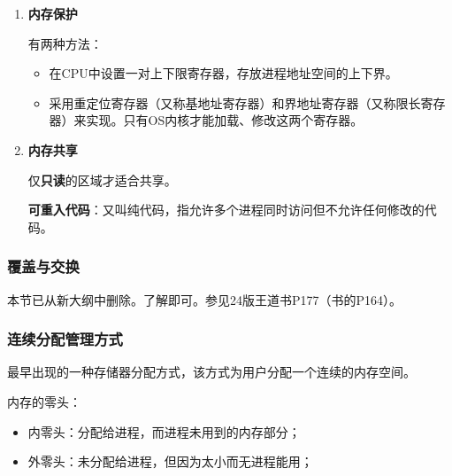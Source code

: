 \documentclass[12pt, a4paper, oneside]{ctexart}
\begin{document}
\begin{enumerate}
  \item {\bf 内存保护}
  
  有两种方法：
  \begin{itemize}
    \item 在CPU中设置一对上下限寄存器，存放进程地址空间的上下界。
    \item 采用重定位寄存器（又称基地址寄存器）和界地址寄存器（又称限长寄存器）来实现。只有OS内核才能加载、修改这两个寄存器。
  \end{itemize}

  \item {\bf 内存共享}
  
  仅\textbf{只读}的区域才适合共享。

  \textbf{可重入代码}：又叫纯代码，指允许多个进程同时访问但不允许任何修改的代码。
\end{enumerate}

\subsubsection{覆盖与交换}

本节已从新大纲中删除。了解即可。参见24版王道书P177（书的P164）。

\subsubsection{连续分配管理方式}

最早出现的一种存储器分配方式，该方式为用户分配一个连续的内存空间。

内存的零头：
\begin{itemize}
  \item 内零头：分配给进程，而进程未用到的内存部分；
  \item 外零头：未分配给进程，但因为太小而无进程能用；
\end{itemize}
\end{document}
